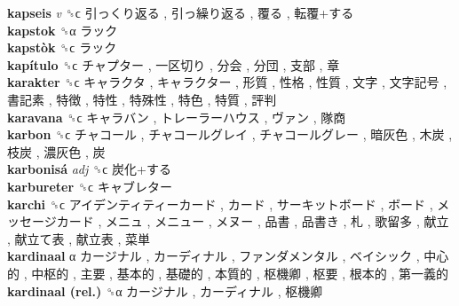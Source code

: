 \textbf{kapseis} \emph{v}  ␝ϲ   引っくり返る ,  引っ繰り返る ,  覆る ,  転覆+する   \\
\textbf{kapstok} ␝α   ラック   \\
\textbf{kapstòk} ␝ϲ   ラック   \\
\textbf{kapítulo} ␝ϲ   チャプター ,  一区切り ,  分会 ,  分団 ,  支部 ,  章   \\
\textbf{karakter} ␝ϲ   キャラクタ ,  キャラクター ,  形質 ,  性格 ,  性質 ,  文字 ,  文字記号 ,  書記素 ,  特徴 ,  特性 ,  特殊性 ,  特色 ,  特質 ,  評判   \\
\textbf{karavana} ␝ϲ   キャラバン ,  トレーラーハウス ,  ヴァン ,  隊商   \\
\textbf{karbon} ␝ϲ   チャコール ,  チャコールグレイ ,  チャコールグレー ,  暗灰色 ,  木炭 ,  枝炭 ,  濃灰色 ,  炭   \\
\textbf{karbonisá} \emph{adj}  ␝ϲ   炭化+する   \\
\textbf{karbureter} ␝ϲ   キャブレター   \\
\textbf{karchi} ␝ϲ   アイデンティティーカード ,  カード ,  サーキットボード ,  ボード ,  メッセージカード ,  メニュ ,  メニュー ,  メヌー ,  品書 ,  品書き ,  札 ,  歌留多 ,  献立 ,  献立て表 ,  献立表 ,  菜単   \\
\textbf{kardinaal} α   カージナル ,  カーディナル ,  ファンダメンタル ,  ベイシック ,  中心的 ,  中枢的 ,  主要 ,  基本的 ,  基礎的 ,  本質的 ,  枢機卿 ,  枢要 ,  根本的 ,  第一義的   \\
\textbf{kardinaal (rel.)} ␝α   カージナル ,  カーディナル ,  枢機卿   \\

